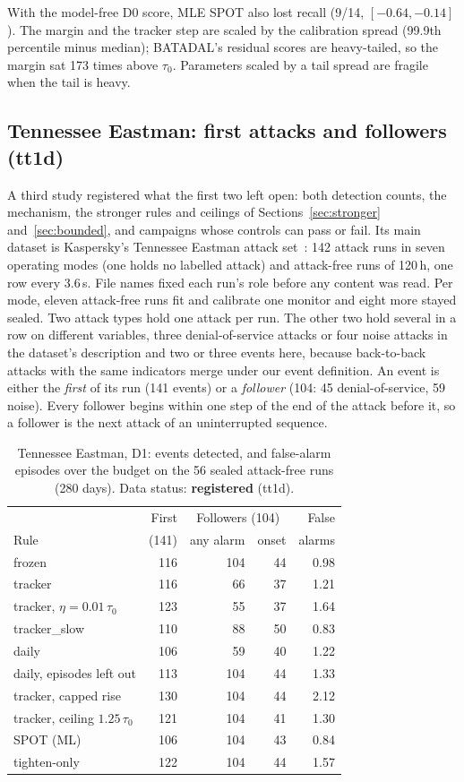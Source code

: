 \documentclass[letterpaper,twocolumn,10pt]{article}
\begin{document}
With the model-free D0 score, MLE SPOT also lost recall (9/14, $[-0.64, -0.14]$). The margin and the
tracker step are scaled by the calibration spread (99.9th percentile minus median); BATADAL's
residual scores are heavy-tailed, so the margin sat 173 times above $\tau_0$. Parameters scaled by a
tail spread are fragile when the tail is heavy.


\subsection{Tennessee Eastman: first attacks and followers (tt1d)}
\label{sec:tep}

A third study registered what the first two left open: both detection counts, the mechanism, the
stronger rules and ceilings of Sections~\ref{sec:stronger} and~\ref{sec:bounded}, and campaigns whose
controls can pass or fail. Its main dataset is Kaspersky's Tennessee Eastman attack
set~\cite{filonov2017tep, downs1993tep}: 142 attack runs in seven operating modes (one holds no
labelled attack) and attack-free runs of 120\,h, one row every 3.6\,s. File names fixed each run's role
before any content was read. Per mode, eleven attack-free runs fit and calibrate one monitor and eight
more stayed sealed. Two attack types hold one attack per run. The other two hold several in a row on
different variables, three denial-of-service attacks or four noise attacks in the dataset's
description and two or three events here, because back-to-back attacks with the same indicators merge
under our event definition. An event is either the \emph{first} of its run (141 events) or a
\emph{follower} (104: 45 denial-of-service, 59 noise). Every follower begins within one step of the end
of the attack before it, so a follower is the next attack of an uninterrupted sequence.

\begin{table}[t]
\caption{Tennessee Eastman, D1: events detected, and false-alarm episodes over the budget on the 56
sealed attack-free runs (280 days). Data status: \textbf{registered} (tt1d).}
\label{tab:tep}
\small
\begin{tabular}{@{}lrrrr@{}}
\toprule
 & First & \multicolumn{2}{c}{Followers (104)} & False \\
Rule & (141) & any alarm & onset & alarms \\
\midrule
frozen & 116 & 104 & 44 & 0.98 \\
tracker & 116 & 66 & 37 & 1.21 \\
tracker, $\eta = 0.01\,\tau_0$ & 123 & 55 & 37 & 1.64 \\
tracker\_slow & 110 & 88 & 50 & 0.83 \\
daily & 106 & 59 & 40 & 1.22 \\
daily, episodes left out & 113 & 104 & 44 & 1.33 \\
tracker, capped rise & 130 & 104 & 44 & 2.12 \\
tracker, ceiling $1.25\,\tau_0$ & 121 & 104 & 41 & 1.30 \\
SPOT (ML) & 106 & 104 & 43 & 0.84 \\
tighten-only & 122 & 104 & 44 & 1.57 \\
\bottomrule
\end{tabular}
\end{table}
\end{document}
